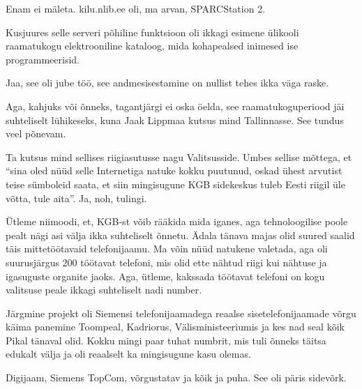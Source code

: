 
Enam ei mäleta. kilu.nlib.ee oli, ma arvan, 
SPARCStation 2.

Kusjuures selle serveri põhiline funktsioon oli ikkagi esimene ülikooli 
raamatukogu  elektrooniline kataloog, mida kohapealsed inimesed ise 
programmeerisid.


Jaa, see oli jube töö, see andmesisestamine on  nullist tehes ikka väga raske.

Aga, kahjuks või õnneks, tagantjärgi ei oska öelda, see raamatukoguperiood jäi 
suhteliselt lühikeseks, kuna Jaak Lippmaa kutsus mind 
Tallinnasse. See tundus veel põnevam. 

Ta kutsus mind sellises riigiasutusse nagu Valitsusside. 
Umbes sellise mõttega, et \enquote{sina oled nüüd selle Internetiga natuke 
kokku puutunud, oskad ühest arvutist teise sümboleid saata, et siin mingisugune 
KGB sidekeskus tuleb Eesti riigil üle võtta, tule aita}. Ja, noh, tulingi.

Ütleme niimoodi, et, KGB-st võib rääkida mida iganes, aga tehnoloogilise poole 
pealt nägi asi välja ikka suhteliselt õnnetu. Ädala tänava 
majas olid suured saalid täis mittetöötavaid 
telefonijaamu. Ma võin nüüd natukene valetada, aga oli suurusjärgus 200 
töötavat telefoni, mis olid  ette nähtud riigi kui nähtuse ja igasuguste 
organite jaoks. Aga, ütleme, kakssada töötavat telefoni on kogu valitsuse peale 
ikkagi suhteliselt nadi number.

Järgmine projekt oli Siemensi telefonijaamadega reaalse sisetelefonijaamade 
võrgu käima panemine Toompeal, Kadriorus, Välisministeeriumis ja kes nad seal 
kõik Pikal tänaval olid. Kokku mingi paar tuhat numbrit, mis tuli õnneks täitsa 
edukalt välja ja oli reaalselt ka mingisugune kasu olemas.


Digijaam, Siemens TopCom,  võrgustatav ja kõik ja puha. See  oli päris sidevõrk.

